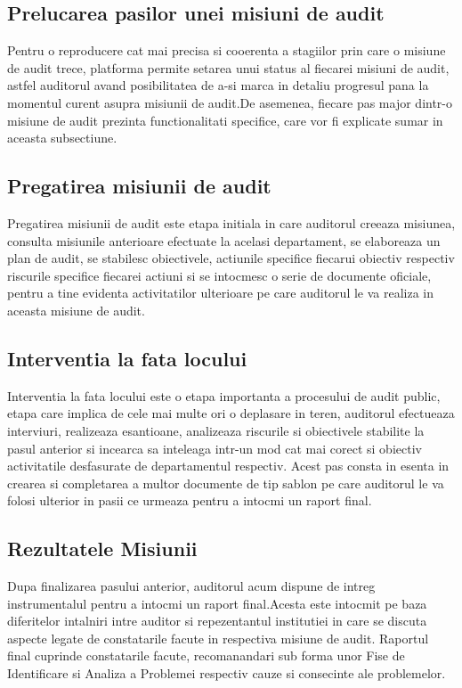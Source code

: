 \subsection{Prelucarea pasilor unei misiuni de audit}

Pentru o reproducere cat mai precisa si cooerenta a stagiilor prin care o misiune de audit trece, platforma permite setarea unui status al fiecarei misiuni de audit, astfel auditorul avand posibilitatea de a-si marca in detaliu progresul pana la momentul curent asupra misiunii de audit.De asemenea, fiecare pas major dintr-o misiune de audit prezinta functionalitati specifice, care vor fi explicate sumar in aceasta subsectiune.
\subsection*{Pregatirea misiunii de audit}
Pregatirea misiunii de audit este etapa initiala in care auditorul creeaza misiunea, consulta misiunile anterioare efectuate la acelasi departament, se elaboreaza un plan de audit, se stabilesc obiectivele, actiunile specifice fiecarui obiectiv respectiv riscurile specifice fiecarei actiuni si se intocmesc o serie de documente oficiale, pentru a tine evidenta activitatilor ulterioare pe care auditorul le va realiza in aceasta misiune de audit.

\subsection*{Interventia la fata locului}
Interventia la fata locului este o etapa importanta a procesului de audit public, etapa care implica de cele mai multe ori o deplasare in teren, auditorul efectueaza interviuri, realizeaza esantioane, analizeaza riscurile si obiectivele stabilite la pasul anterior si incearca sa inteleaga intr-un mod cat mai corect si obiectiv activitatile desfasurate de departamentul respectiv. Acest pas consta in esenta in crearea si completarea a multor documente de tip sablon pe care auditorul le va folosi ulterior in pasii ce urmeaza pentru a intocmi un raport final.

\subsection*{Rezultatele Misiunii}
Dupa finalizarea pasului anterior, auditorul acum dispune de intreg instrumentalul pentru a intocmi un raport final.Acesta este intocmit pe baza diferitelor intalniri intre auditor si repezentantul institutiei in care se discuta aspecte legate de constatarile facute in respectiva misiune de audit. Raportul final cuprinde constatarile facute, recomanandari sub forma 
unor Fise de Identificare si Analiza a Problemei respectiv cauze si consecinte ale problemelor.

